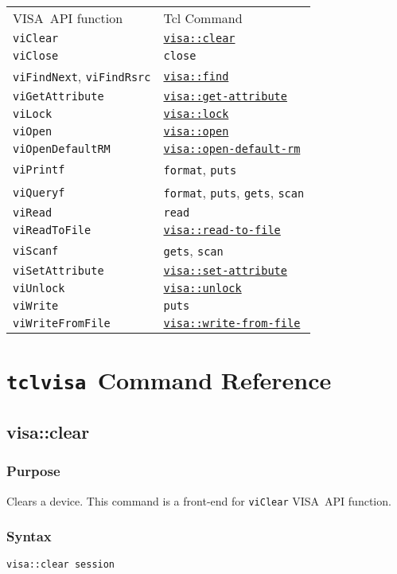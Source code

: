 \documentclass[12pt, a4paper]{book}
\newcommand{\tclvisa}{{\tt tclvisa }}
\newcommand{\VISA}{\mbox{VISA }}
\newcommand{\COMMANDREF}[1]{{\tt \hyperref[#1]{#1}}}
\newcommand{\VISACOMMANDREF}[1]{{\tt \mbox{#1}}\index{#1}}
\newcommand{\TCLCOMMANDREF}[1]{{\tt \mbox{#1}}\index{#1}}
\newcommand{\PURPOSE}{\subsection{Purpose}}
\newcommand{\SYNTAX}[1]{\subsection{Syntax}{\tt #1}}
\newcommand{\COMMAND}[1]{\section{#1}\label{#1}}
\begin{document}
\begin{tabular}{ll}
\VISA API function & Tcl Command \\
\VISACOMMANDREF{viClear} & \COMMANDREF{visa::clear}	\\
\VISACOMMANDREF{viClose} & \TCLCOMMANDREF{close}	\\
\VISACOMMANDREF{viFindNext}, \VISACOMMANDREF{viFindRsrc} & \COMMANDREF{visa::find}	\\
\VISACOMMANDREF{viGetAttribute} & \COMMANDREF{visa::get-attribute}	\\
\VISACOMMANDREF{viLock} & \COMMANDREF{visa::lock}	\\
\VISACOMMANDREF{viOpen} & \COMMANDREF{visa::open}	\\
\VISACOMMANDREF{viOpenDefaultRM} & \COMMANDREF{visa::open-default-rm}	\\
\VISACOMMANDREF{viPrintf} & \TCLCOMMANDREF{format}, \TCLCOMMANDREF{puts}	\\
\VISACOMMANDREF{viQueryf} & \TCLCOMMANDREF{format}, \TCLCOMMANDREF{puts}, \TCLCOMMANDREF{gets}, \TCLCOMMANDREF{scan}	\\
\VISACOMMANDREF{viRead} & \TCLCOMMANDREF{read}	\\
\VISACOMMANDREF{viReadToFile} & \COMMANDREF{visa::read-to-file}	\\
\VISACOMMANDREF{viScanf} & \TCLCOMMANDREF{gets}, \TCLCOMMANDREF{scan}	\\
\VISACOMMANDREF{viSetAttribute} & \COMMANDREF{visa::set-attribute}	\\
\VISACOMMANDREF{viUnlock} & \COMMANDREF{visa::unlock}	\\
\VISACOMMANDREF{viWrite} & \TCLCOMMANDREF{puts}	\\
\VISACOMMANDREF{viWriteFromFile} & \COMMANDREF{visa::write-from-file}	\\
\end{tabular}

\chapter{\tclvisa Command Reference}


\COMMAND{visa::clear}

\PURPOSE

Clears a device. This command is a front-end for \VISACOMMANDREF{viClear} \VISA API function.

\SYNTAX{visa::clear session}
\end{document}
